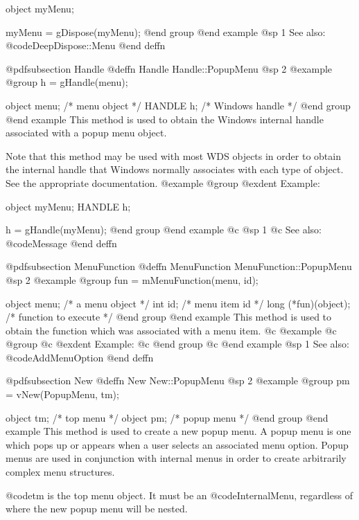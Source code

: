 object  myMenu;

myMenu = gDispose(myMenu);
@end group
@end example
@sp 1
See also:  @code{DeepDispose::Menu}
@end deffn








@pdfsubsection {Handle}
@deffn {Handle} Handle::PopupMenu
@sp 2
@example
@group
h = gHandle(menu);

object  menu;   /*  menu object    */
HANDLE  h;      /*  Windows handle */
@end group
@end example
This method is used to obtain the Windows internal handle associated with
a popup menu object.  

Note that this method may be used with most WDS objects in order to obtain
the internal handle that Windows normally associates with each type of object.
See the appropriate documentation.
@example
@group
@exdent Example:

object  myMenu;
HANDLE  h;

h = gHandle(myMenu);
@end group
@end example
@c @sp 1
@c See also:  @code{Message}
@end deffn








@pdfsubsection {MenuFunction}
@deffn {MenuFunction} MenuFunction::PopupMenu
@sp 2
@example
@group
fun = mMenuFunction(menu, id);

object  menu;   /*  a menu object     */
int     id;     /*  menu item id      */
long    (*fun)(object);  /*  function to execute  */
@end group
@end example
This method is used to obtain the function which was associated with a
menu item.
@c @example
@c @group
@c @exdent Example:
@c @end group
@c @end example
@sp 1
See also:  @code{AddMenuOption}
@end deffn








@pdfsubsection {New}
@deffn {New} New::PopupMenu
@sp 2
@example
@group
pm = vNew(PopupMenu, tm);

object  tm;     /*  top menu    */
object  pm;     /*  popup menu  */
@end group
@end example
This method is used to create a new popup menu.  A popup menu is one
which pops up or appears when a user selects an associated menu option.
Popup menus are used in conjunction with internal menus in order to
create arbitrarily complex menu structures.

@code{tm} is the top menu object.  It must be an @code{InternalMenu},
regardless of where the new popup menu will be nested.

